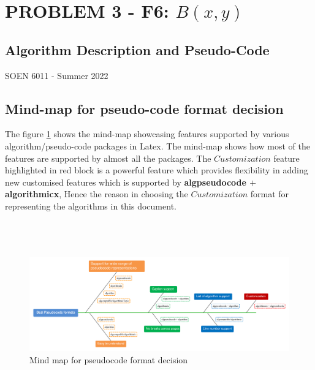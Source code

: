 \documentclass[letterpaper, 11pt]{article}
\begin{document}
\tableofcontents
\listofalgorithms


\newpage

\section{
    {PROBLEM 3 - F6: $B(x, y)$}}

    \subsection{Algorithm Description and Pseudo-Code}
        \normalsize {SOEN 6011 - Summer 2022}
        \\
    \subsection{Mind-map for pseudo-code format decision} 
        The figure \ref{fig:mindmap}  shows the mind-map showcasing features supported by various algorithm/pseudo-code packages in Latex. The  mind-map shows how most of the features are supported by almost all the packages. The {$Customization$} feature highlighted in red block is a powerful feature which provides flexibility in adding new customised features which is supported by \textbf{algpseudocode $+$ algorithmicx}, Hence the  reason in choosing the {$Customization$} format for representing the algorithms in this document.\cite{Pseudo-code}
        \\\\\\\
    \begin{figure}[htb]
        \begin{center}
            \includegraphics[width=18cm]{images/mindmap_pseudo.png}
        \end{center}
        \caption{Mind map for pseudocode format decision}
        \label{fig:mindmap}
    \end{figure}
    \newpage
\end{document}

